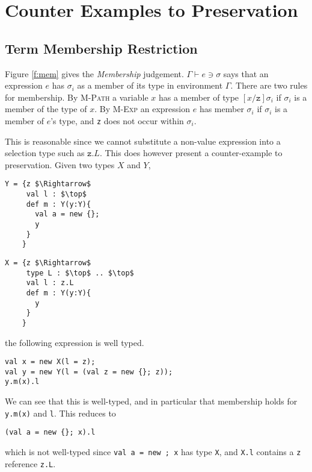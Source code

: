 \documentclass{llncs}
\numberwithin{subcase}{casethm}
\numberwithin{casethm}{theorem}
\numberwithin{casethm}{lemma}
\begin{document}
\section{Counter Examples to Preservation}
	\label{s:examples}

\subsection{Term Membership Restriction}
	\label{s:term_mem}
Figure \ref{f:mem} gives the \emph{Membership} judgement. 
$\Gamma \vdash e \ni \sigma$ says that an expression $e$ 
has $\sigma_i$ as a member of its type in environment $\Gamma$. 
There are two rules for membership. By \textsc{M-Path} a 
variable $x$ has a member of type $[x/\texttt{z}]\sigma_i$ 
if $\sigma_i$ is a member of the type of $x$. By \textsc{M-Exp}
an expression $e$ has member $\sigma_i$ if $\sigma_i$ is 
a member of $e$'s type, and \texttt{z} does not occur 
within $\sigma_i$.

This is reasonable since we cannot substitute a non-value 
expression into a selection type such as $\texttt{z}.L$. 
This does however present a counter-example to preservation. 
Given two types $X$ and $Y$,

\begin{lstlisting}[mathescape, style=custom_lang]
Y = {z $\Rightarrow$
     val l : $\top$
     def m : Y(y:Y){
       val a = new {};
       y
     }
    }
\end{lstlisting}
\begin{lstlisting}[mathescape, style=custom_lang]
X = {z $\Rightarrow$
     type L : $\top$ .. $\top$
     val l : z.L
     def m : Y(y:Y){
       y
     }
    }
\end{lstlisting}

the following expression is well typed.
\begin{lstlisting}[mathescape, style=custom_lang]
val x = new X(l = z);
val y = new Y(l = (val z = new {}; z));
y.m(x).l
\end{lstlisting}
We can see that this is well-typed, and in particular that membership 
holds for \texttt{y.m(x)} and \texttt{l}. This reduces to 
\begin{lstlisting}[mathescape, style=custom_lang]
(val a = new {}; x).l
\end{lstlisting}
which is not well-typed since \texttt{val a = new {}; x} has type 
\texttt{X}, and \texttt{X.l} contains a \texttt{z} reference 
\texttt{z.L}.
\end{document}
